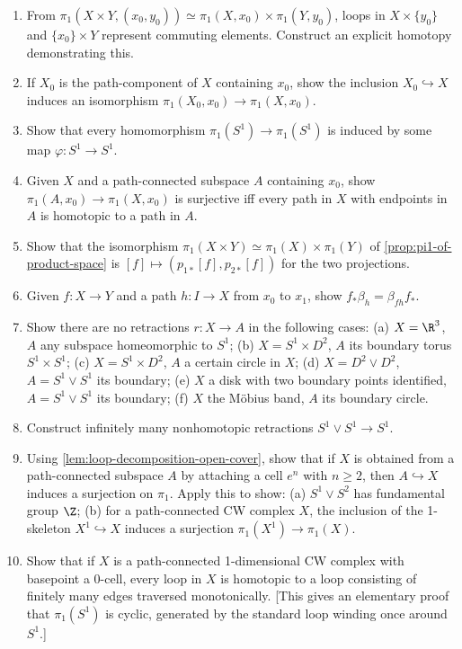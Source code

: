 \begin{enumerate}
\item From $\pi_1(X\times Y,(x_0,y_0)) \simeq \pi_1(X,x_0)\times\pi_1(Y,y_0)$, loops in
$X\times\{y_0\}$ and $\{x_0\}\times Y$ represent commuting elements. Construct an explicit
homotopy demonstrating this.

\item If $X_0$ is the path-component of $X$ containing $x_0$, show the inclusion
$X_0\hookrightarrow X$ induces an isomorphism $\pi_1(X_0,x_0)\to\pi_1(X,x_0)$.

\item Show that every homomorphism $\pi_1(S^1)\to\pi_1(S^1)$ is induced by some map
$\varphi:S^1\to S^1$.

\item Given $X$ and a path-connected subspace $A$ containing $x_0$, show
$\pi_1(A,x_0)\to\pi_1(X,x_0)$ is surjective iff every path in $X$ with endpoints in $A$ is
homotopic to a path in $A$.

\item Show that the isomorphism $\pi_1(X\times Y)\simeq\pi_1(X)\times\pi_1(Y)$ of
\cref{prop:pi1-of-product-space} is $[f]\mapsto(p_{1*}[f],p_{2*}[f])$ for the two projections.

\item Given $f:X\to Y$ and a path $h:I\to X$ from $x_0$ to $x_1$, show
$f_*\beta_h = \beta_{fh}f_*$.

\item Show there are no retractions $r:X\to A$ in the following cases: (a)
$X=\R^3$, $A$ any subspace homeomorphic to $S^1$; (b) $X=S^1\times D^2$, $A$ its
boundary torus $S^1\times S^1$; (c) $X=S^1\times D^2$, $A$ a certain circle in $X$; (d)
$X=D^2\vee D^2$, $A=S^1\vee S^1$ its boundary; (e) $X$ a disk with two boundary
points identified, $A=S^1\vee S^1$ its boundary; (f) $X$ the M\"obius band, $A$ its
boundary circle.

\item Construct infinitely many nonhomotopic retractions $S^1\vee S^1\to S^1$.

\item Using \cref{lem:loop-decomposition-open-cover}, show that if $X$ is obtained from a
path-connected subspace $A$ by attaching a cell $e^n$ with $n\ge 2$, then
$A\hookrightarrow X$ induces a surjection on $\pi_1$. Apply this to show: (a) $S^1\vee S^2$
has fundamental group $\Z$; (b) for a path-connected CW complex $X$, the inclusion
of the 1-skeleton $X^1\hookrightarrow X$ induces a surjection $\pi_1(X^1)\to\pi_1(X)$.

\item Show that if $X$ is a path-connected 1-dimensional CW complex with
basepoint a 0-cell, every loop in $X$ is homotopic to a loop consisting of finitely
many edges traversed monotonically. [This gives an elementary proof that
$\pi_1(S^1)$ is cyclic, generated by the standard loop winding once around $S^1$.]
\end{enumerate}

